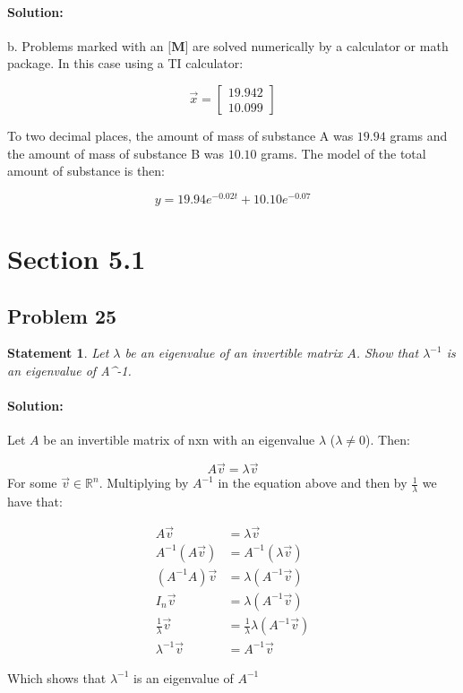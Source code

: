 \documentclass[12pt, letterpaper]{article}
\newcommand{\R}{\mathbb{R}}
\theoremstyle{statement}
\theoremstyle{statement}
\newtheorem*{atmStat}{Statement}
\newenvironment{Solution}{\noindent\ignorespaces\paragraph{Solution:}}{\hfill \ding{122}\par\noindent}
\begin{document}
\begin{Solution}
    b. Problems marked with an $\textbf{[M]}$ are solved numerically by a calculator or math package. In this case using a TI calculator: 
    
    $$
    \vec{x}=
    \begin{bmatrix}
    19.942 \\ 10.099
    \end{bmatrix}
    $$
    
    To two decimal places, the amount of mass of substance A was $19.94$ grams and the amount of mass of substance B was $10.10$ grams. The model of the total amount of substance is then:
    
    $$
    y=19.94e^{-0.02t}+10.10e^{-0.07}
    $$
    
    \end{Solution}
    
    \section*{Section 5.1}
    \subsection*{Problem 25}
    \begin{atmStat}
    Let $\lambda$ be an eigenvalue of an invertible matrix $A$. Show that $\lambda^{-1}$ is an eigenvalue of A^{-1}.
    \end{atmStat}
    \begin{Solution}
    Let $A$ be an invertible matrix of nxn with an eigenvalue $\lambda$ ($\lambda\neq 0$). Then: 
    
    $$
    A\Vec{v}=\lambda\Vec{v}
    $$
    For some $\Vec{v}\in\R^n$. Multiplying by $A^{-1}$ in the equation above and then by $\frac{1}{\lambda}$ we have that:
    
    \begin{align*}
        A\Vec{v}&=\lambda\Vec{v} \\
        A^{-1}(A\Vec{v}) &= A^{-1} (\lambda\Vec{v}) \\
        (A^{-1}A)\Vec{v} &= \lambda(A^{-1}\vec{v}) \\
        I_n\vec{v} &= \lambda(A^{-1}\vec{v}) \\
        \frac{1}{\lambda}\vec{v} &= \frac{1}{\lambda} \lambda(A^{-1}\vec{v}) \\
        \lambda^{-1}\vec{v} &= A^{-1} \vec{v}
    \end{align*}
    
    Which shows that $\lambda^{-1}$ is an eigenvalue of $A^{-1}$
    
    \end{Solution}
    
\end{document}
